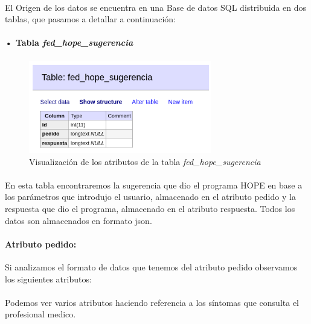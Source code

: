 \documentclass[10pt,a4paper]{book}
\begin{document}
\paragraph{}
El Origen de los datos se encuentra en una Base de datos SQL distribuida en dos tablas, que pasamos a detallar a continuación:

\paragraph{• Tabla \textit{fed\_hope\_sugerencia}}

\paragraph{}
\begin{figure}[h]
  \centering
  \includegraphics[width=8cm]{images/extraccion_1_1.png}
  \caption{Visualización de los atributos de la tabla \textit{fed\_hope\_sugerencia}}
\end{figure}

\paragraph{}
En esta tabla encontraremos la sugerencia que dio el programa HOPE en base a los parámetros que introdujo el usuario, almacenado en el atributo pedido y la respuesta que dio el programa, almacenado en el atributo respuesta. Todos los datos son almacenados en formato json.

\newpage
\paragraph{\textbf{Atributo pedido}: } Si analizamos el formato de datos que tenemos del atributo pedido observamos los siguientes atributos:

\lstset{inputencoding=utf8/latin1}


\paragraph{}
Podemos ver varios atributos haciendo referencia a los síntomas que consulta el profesional medico.
\end{document}

